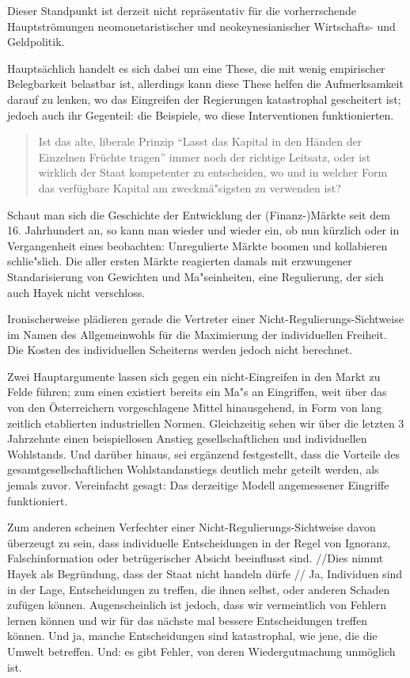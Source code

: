 \documentclass[
        onecolumn,
        a4paper,
        abstracton,
        parskip=half
        ,final
        ]{scrartcl}
\begin{document}
Dieser Standpunkt ist derzeit nicht repr{\"a}sentativ f{\"u}r die vorherrschende Hauptstr{\"o}mungen neomonetaristischer und neokeynesianischer Wirtschafts- und Geldpolitik.

Haupts{\"a}chlich handelt es sich dabei um eine These, die mit wenig empirischer Belegbarkeit belastbar ist, allerdings kann diese These helfen die Aufmerksamkeit darauf zu lenken, wo das Eingreifen der Regierungen katastrophal gescheitert ist; jedoch auch ihr Gegenteil: die Beispiele, wo diese Interventionen funktionierten.

\begin{quote}
Ist das alte, liberale Prinzip "`Lasst das Kapital in den H{\"a}nden der Einzelnen Fr{\"u}chte tragen"' immer noch der richtige Leitsatz,
oder ist wirklich der Staat kompetenter zu entscheiden, wo und in welcher Form das verf{\"u}gbare Kapital am zweckm{\"a}{"s}igsten zu verwenden ist? \citep*[S.23f]{Hayek1969}
\end{quote}

Schaut man sich die Geschichte der Entwicklung der (Finanz-)M{\"a}rkte seit dem 16. Jahrhundert an, so kann man wieder und wieder ein, ob nun k{\"u}rzlich oder in Vergangenheit eines beobachten: Unregulierte M{\"a}rkte boomen und kollabieren schlie{"s}lich. Die aller ersten M{\"a}rkte reagierten damals mit erzwungener Standarisierung von Gewichten und Ma{"s}einheiten, eine Regulierung, der sich auch Hayek nicht verschloss.

Ironischerweise pl{\"a}dieren gerade die Vertreter einer Nicht-Regulierungs-Sichtweise im Namen des Allgemeinwohls f{\"u}r die Maximierung der individuellen Freiheit. Die Kosten des individuellen Scheiterns werden jedoch nicht berechnet.

Zwei Hauptargumente lassen sich gegen ein nicht-Eingreifen in den Markt zu Felde f{\"u}hren; zum einen existiert bereits ein Ma{"s} an Eingriffen, weit {\"u}ber das von den {\"O}sterreichern vorgeschlagene Mittel hinausgehend, in Form von lang zeitlich etablierten industriellen Normen. Gleichzeitig sehen wir {\"u}ber die letzten 3 Jahrzehnte einen beispiellosen Anstieg gesellschaftlichen und individuellen Wohlstands. Und dar{\"u}ber hinaus, sei erg{\"a}nzend festgestellt, dass die Vorteile des gesamtgesellschaftlichen Wohlstandanstiegs deutlich mehr geteilt werden, als jemals zuvor. Vereinfacht gesagt: Das derzeitige Modell angemessener Eingriffe funktioniert.

Zum anderen scheinen Verfechter einer Nicht-Regulierungs-Sichtweise davon {\"u}berzeugt zu sein, dass individuelle Entscheidungen in der Regel von Ignoranz, Falschinformation oder betr{\"u}gerischer Absicht beeinflusst sind. //Dies nimmt Hayek als Begr{\"u}ndung, dass der Staat nicht handeln d{\"u}rfe //
Ja, Individuen sind in der Lage, Entscheidungen zu treffen, die ihnen selbst, oder anderen Schaden zuf{\"u}gen k{\"o}nnen. Augenscheinlich ist jedoch, dass wir vermeintlich von Fehlern lernen k{\"o}nnen und wir f{\"u}r das n{\"a}chste mal bessere Entscheidungen treffen k{\"o}nnen. Und ja, manche Entscheidungen sind katastrophal, wie jene, die die Umwelt betreffen. Und: es gibt Fehler, von deren Wiedergutmachung unm{\"o}glich ist.
\end{document}
